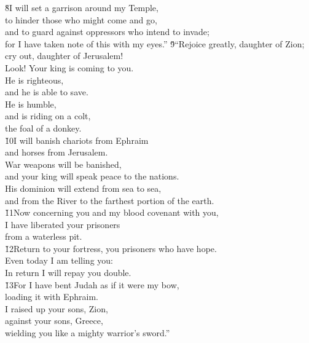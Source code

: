 \begin{poetry}
\poeml \v{8}I will set a garrison around my Temple, \\
\poemll    to hinder those who might come and go, \\
\poeml and to guard against oppressors who intend to invade; \\
\poemll    for I have taken note of this with my eyes.''
\poeml \v{9}``Rejoice greatly, daughter of Zion; \\
\poemll    cry out, daughter of Jerusalem! \\
\poeml Look! Your king is coming to you. \\
\poemll    He is righteous, \\
\poemlll       and he is able to save. \\
\poeml He is humble, \\
\poemll    and is riding on a colt, \\
\poemlll       the foal of a donkey. \\
\poeml \v{10}I will banish chariots from Ephraim \\
\poemll    and horses from Jerusalem. \\
\poeml War weapons will be banished, \\
\poemll    and your king will speak peace to the nations. \\
\poeml His dominion will extend from sea to sea, \\
\poemll    and from the River to the farthest portion of the earth. \\
\poeml \v{11}Now concerning you and my blood covenant with you, \\
\poemll    I have liberated your prisoners \\
\poemlll       from a waterless pit. \\
\poeml \v{12}Return to your fortress, you prisoners who have hope. \\
\poemll    Even today I am telling you: \\
\poemlll       In return I will repay you double. \\
\poeml \v{13}For I have bent Judah as if it were my bow, \\
\poemll    loading it with Ephraim. \\
\poeml I raised up your sons, Zion, \\
\poemll    against your sons, Greece, \\
\poemlll       wielding you like a mighty warrior's sword.''

\end{poetry}

